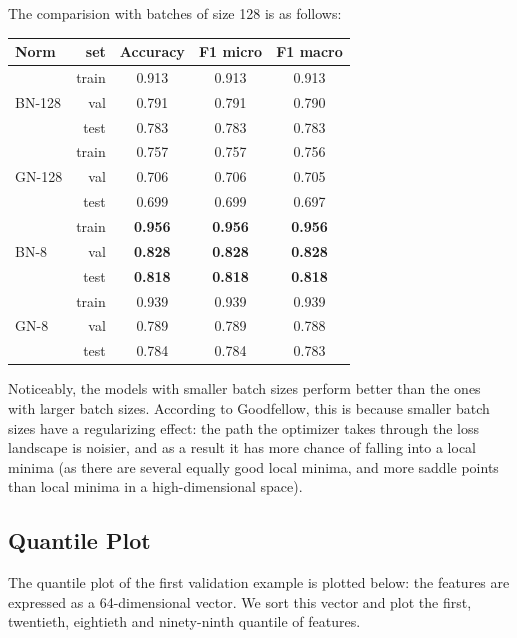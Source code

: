 \documentclass[12pt]{article}
\begin{document}
The comparision with batches of size 128 is as follows:

\begin{center}
\begin{tabular}{|l|r|c|c|c|}
    \hline
    Norm & set & Accuracy & F1 micro & F1 macro \\
    \hline
    \multirow{3}{*}{BN-128}%
    & train & 0.913 & 0.913 & 0.913 \\
    & val & 0.791 & 0.791 & 0.790 \\
    & test & 0.783 & 0.783 & 0.783 \\
    \hline

    \multirow{3}{*}{GN-128}%
    & train & 0.757 & 0.757 & 0.756 \\
    & val & 0.706 & 0.706 & 0.705 \\
    & test & 0.699 & 0.699 & 0.697 \\
    \hline

    \hline
    \multirow{3}{*}{BN-8}%
    & train & \textbf{0.956} & \textbf{0.956} & \textbf{0.956} \\
    & val & \textbf{0.828} & \textbf{0.828} & \textbf{0.828} \\
    & test & \textbf{0.818} & \textbf{0.818} & \textbf{0.818} \\
    \hline

    \hline
    \multirow{3}{*}{GN-8}%
    & train & 0.939 & 0.939 & 0.939 \\
    & val & 0.789 & 0.789 & 0.788 \\
    & test & 0.784 & 0.784 & 0.783 \\
    \hline
\end{tabular}
\end{center}

Noticeably, the models with smaller batch sizes perform better than the ones 
with larger batch sizes. According to Goodfellow, this is because smaller 
batch sizes have a regularizing effect: the path the optimizer takes through
the loss landscape is noisier, and as a result it has more chance of falling 
into a local minima (as there are several equally good local minima, and more
saddle points than local minima in a high-dimensional space).

\pagebreak
\subsection{Quantile Plot}

The quantile plot of the first validation example is plotted below: the features
are expressed as a 64-dimensional vector. We sort this vector and plot the first,
twentieth, eightieth and ninety-ninth quantile of features. 
\end{document}
